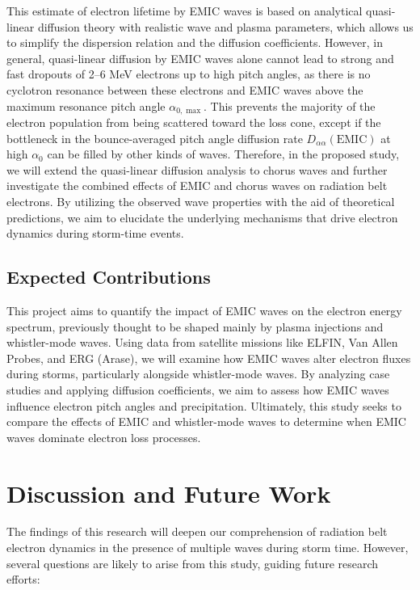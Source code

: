 \documentclass[
  letterpaper,
  DIV=11,
  numbers=noendperiod]{scrartcl}
\begin{document}
This estimate of electron lifetime by EMIC waves is based on analytical quasi-linear diffusion theory with realistic wave and plasma parameters, which allows us to simplify the dispersion relation and the diffusion coefficients. However, in general, quasi-linear diffusion by EMIC waves alone cannot lead to strong and fast dropouts of 2--6 MeV electrons up to high pitch angles, as there is no cyclotron resonance between these electrons and EMIC waves above the maximum resonance pitch angle \(\alpha_{0,\max}\). This prevents the majority of the electron population from being scattered toward the loss cone, except if the bottleneck in the bounce-averaged pitch angle diffusion rate \(D_{\alpha\alpha}(\text{EMIC})\) at high \(\alpha_0\) can be filled by other kinds of waves. Therefore, in the proposed study, we will extend the quasi-linear diffusion analysis to chorus waves and further investigate the combined effects of EMIC and chorus waves on radiation belt electrons. By utilizing the observed wave properties with the aid of theoretical predictions, we aim to elucidate the underlying mechanisms that drive electron dynamics during storm-time events.

\subsection{Expected Contributions}\label{expected-contributions}

This project aims to quantify the impact of EMIC waves on the electron energy spectrum, previously thought to be shaped mainly by plasma injections and whistler-mode waves. Using data from satellite missions like ELFIN, Van Allen Probes, and ERG (Arase), we will examine how EMIC waves alter electron fluxes during storms, particularly alongside whistler-mode waves. By analyzing case studies and applying diffusion coefficients, we aim to assess how EMIC waves influence electron pitch angles and precipitation. Ultimately, this study seeks to compare the effects of EMIC and whistler-mode waves to determine when EMIC waves dominate electron loss processes.

\section{Discussion and Future Work}\label{discussion-and-future-work}

The findings of this research will deepen our comprehension of radiation belt electron dynamics in the presence of multiple waves during storm time. However, several questions are likely to arise from this study, guiding future research efforts:
\end{document}
